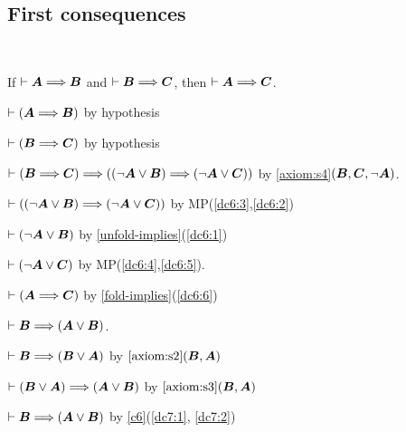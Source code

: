 \subsection{First consequences} \ 

\begin{dc}\label{c6}%
If $\vdash\boldsymbol{A}\Longrightarrow\boldsymbol{B}$ and $\vdash\boldsymbol{B}\Longrightarrow\boldsymbol{C}$,
then $\vdash\boldsymbol{A}\Longrightarrow\boldsymbol{C}$.
\end{dc}

\begin{pf}
\item\label{dc6:1} $\vdash(\boldsymbol{A}\Longrightarrow\boldsymbol{B})$
  by hypothesis
\item\label{dc6:2} $\vdash(\boldsymbol{B}\Longrightarrow\boldsymbol{C})$
  by hypothesis
\item\label{dc6:3} $\vdash(\boldsymbol{B}\Longrightarrow\boldsymbol{C})\Longrightarrow((\neg\boldsymbol{A}\lor\boldsymbol{B})\Longrightarrow(\neg\boldsymbol{A}\lor\boldsymbol{C}))$
  by \ref{axiom:s4}$(\boldsymbol{B},\boldsymbol{C},\neg\boldsymbol{A})$.
\item\label{dc6:4} $\vdash((\neg\boldsymbol{A}\lor\boldsymbol{B})\Longrightarrow(\neg\boldsymbol{A}\lor\boldsymbol{C}))$
  by MP(\ref{dc6:3},\ref{dc6:2})
\item\label{dc6:5} $\vdash(\neg\boldsymbol{A}\lor\boldsymbol{B})$
  by \ref{unfold-implies}(\ref{dc6:1})
\item\label{dc6:6} $\vdash(\neg\boldsymbol{A}\lor\boldsymbol{C})$ by MP(\ref{dc6:4},\ref{dc6:5}).
\item\label{dc6:7} $\vdash(\boldsymbol{A}\Longrightarrow\boldsymbol{C})$ by \ref{fold-implies}(\ref{dc6:6})
\end{pf}

\begin{dc}\label{c7}%
$\vdash\boldsymbol{B}\Longrightarrow(\boldsymbol{A}\lor\boldsymbol{B})$.
\end{dc}

\begin{pf}
\item\label{dc7:1} $\vdash\boldsymbol{B}\Longrightarrow(\boldsymbol{B}\lor\boldsymbol{A})$
  by $\ref{axiom:s2}(\boldsymbol{B},\boldsymbol{A})$
\item\label{dc7:2} $\vdash(\boldsymbol{B}\lor\boldsymbol{A})\Longrightarrow(\boldsymbol{A}\lor\boldsymbol{B})$
  by $\ref{axiom:s3}(\boldsymbol{B},\boldsymbol{A})$
\item $\vdash\boldsymbol{B}\Longrightarrow(\boldsymbol{A}\lor\boldsymbol{B})$
  by \ref{c6}(\ref{dc7:1}, \ref{dc7:2})
\end{pf}

